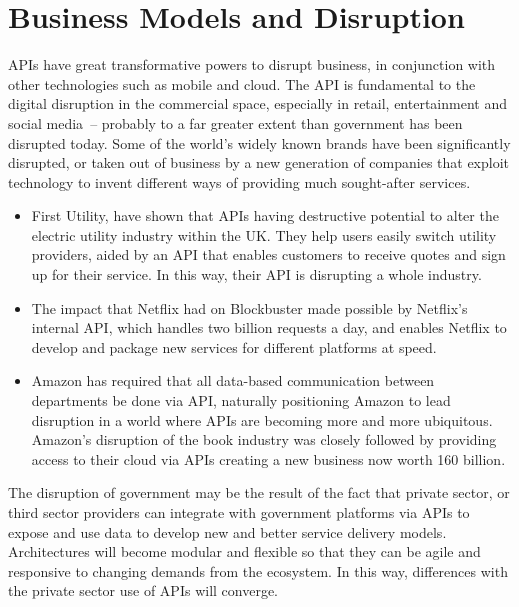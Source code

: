 \section{Business Models and Disruption}

APIs have great transformative powers to disrupt business, in conjunction
with other technologies such as mobile and cloud.
The API is fundamental to the digital disruption in the commercial space,
especially in retail, entertainment and social media~\citep{api_economy}– probably
to a far greater extent than government has been disrupted today. Some
of the world’s widely known brands have been significantly disrupted, or taken
out of business by a new generation of companies that exploit technology to
invent different ways of providing much sought-after services.
\begin{itemize}
	
	\item First Utility, have shown that APIs having destructive potential to alter the electric utility industry within the UK. They help users easily switch utility providers, aided by an API that enables customers to receive quotes and sign up for their service. In this way, their API is disrupting a whole industry.
	
	
	\item The impact that Netflix had on Blockbuster made possible by
	Netflix’s internal API, which handles two billion requests a day,
	and enables Netflix to develop and package new services for different
	platforms at speed.
	
	\item Amazon has required that all data-based communication between
	departments be done via API, naturally positioning Amazon to lead
	disruption in a world where APIs are becoming more and more ubiquitous.
	Amazon’s disruption of the book industry was closely followed by providing
	access to their cloud via APIs creating a new business now worth 160 billion.
	
\end{itemize}

The disruption of government may be the result of the fact that private sector,
or third sector providers can integrate with government platforms via APIs
to expose and use data to develop new and better service delivery models.
Architectures will become modular and flexible so that they can be agile and responsive to
changing demands from the ecosystem. In this way, differences with the private sector
use of APIs will converge.

